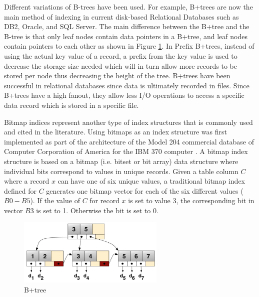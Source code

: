 \documentclass[12pt,a4paper]{article}
\begin{document}
Different variations of B-trees have been used. For example, B+trees are now the main method of indexing in current disk-based Relational Databases
\cite{lightstone2007physical} such as DB2, Oracle, and SQL Server. The main difference between the B+tree and the B-tree is that only leaf nodes contain
data pointers in a B+tree, and leaf nodes contain pointers to each other as shown in Figure \ref{fig:b+tree}. In Prefix B+trees, instead of using the actual key
value of a record, a prefix from the key value is used to decrease the storage size needed which will in turn allow more records to be stored per node thus
decreasing the height of the tree. B+trees have been successful in relational databases since data is ultimately recorded in files. Since B+trees have a high
fanout, they allow less I/O operations to access a specific data record which is stored in a specific file.

Bitmap indices represent another type of index structures that is commonly used and cited in the literature. Using bitmaps as an index structure was first
implemented as part of the architecture of the Model 204 commercial database of Computer Corporation of America for the IBM 370 computer
\cite{patrick1987model}.
A bitmap index structure is based on a bitmap (i.e. bitset or bit array) data structure where individual bits correspond to values in unique records. Given a
table column $C$ where a record $x$ can have one of six unique values, a traditional bitmap index defined for $C$ generates one bitmap vector for each of the
six different values ($B0-B5$). If the value of $C$ for record $x$ is set to value 3, the corresponding bit in vector $B3$ is set to 1. Otherwise the bit is set
to 0.

\begin{figure}[!t]
\centering
\includegraphics[width=7cm]{figs/b+tree.png}
\caption{B+tree}
\label{fig:b+tree}
\end{figure}
\end{document}
